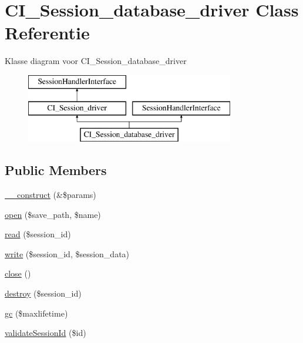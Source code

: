 \hypertarget{class_c_i___session__database__driver}{}\section{C\+I\+\_\+\+Session\+\_\+database\+\_\+driver Class Referentie}
\label{class_c_i___session__database__driver}
Klasse diagram voor C\+I\+\_\+\+Session\+\_\+database\+\_\+driver\begin{figure}[H]
\begin{center}
\leavevmode
\includegraphics[height=3.000000cm]{class_c_i___session__database__driver}
\end{center}
\end{figure}
\subsection*{Public Members}
\begin{DoxyCompactItemize}
\item 
\mbox{\hyperlink{class_c_i___session__database__driver_ac1669c73d53d6f16cf5459a1e84d39c8}{\+\_\+\+\_\+construct}} (\&\$params)
\item 
\mbox{\hyperlink{class_c_i___session__database__driver_a614b5cf3840833913c7a73260ed28e02}{open}} (\$save\+\_\+path, \$name)
\item 
\mbox{\hyperlink{class_c_i___session__database__driver_a5bbf84ebf657be4eaccc0582377c76bf}{read}} (\$session\+\_\+id)
\item 
\mbox{\hyperlink{class_c_i___session__database__driver_ad9d124885be93668f1dbf6aace5964f5}{write}} (\$session\+\_\+id, \$session\+\_\+data)
\item 
\mbox{\hyperlink{class_c_i___session__database__driver_aa69c8bf1f1dcf4e72552efff1fe3e87e}{close}} ()
\item 
\mbox{\hyperlink{class_c_i___session__database__driver_aaec5812f6b4eb6835f88d3baa06a002a}{destroy}} (\$session\+\_\+id)
\item 
\mbox{\hyperlink{class_c_i___session__database__driver_a57aff7ee0656d8aa75d545fb8b3ae35d}{gc}} (\$maxlifetime)
\item 
\mbox{\hyperlink{class_c_i___session__database__driver_a7bee5f3a24cb93e5a7fc371e05046f20}{validate\+Session\+Id}} (\$id)
\end{DoxyCompactItemize}
